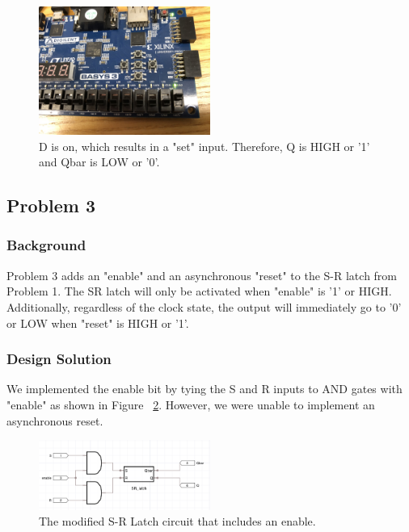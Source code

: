 \documentclass[11pt]{article}
\begin{document}
\begin{figure}[H]
\begin{center}
	\includegraphics[width=0.5\textwidth]{./images/img_202.jpg}
	\caption{\label{fig:dResultTwo}D is on, which results in a "set" input. Therefore, Q is HIGH or '1' and Qbar is LOW or '0'.}
\end{center}
\end{figure}

\subsection{Problem 3}

\subsubsection{Background}
Problem 3 adds an "enable" and an asynchronous "reset" to the S-R latch from Problem 1. The SR latch will only be activated when "enable" is '1' or HIGH. Additionally, regardless of the clock state, the output will immediately go to '0' or LOW when "reset" is HIGH or '1'.

\subsubsection{Design Solution}
We implemented the enable bit by tying the S and R inputs to AND gates with "enable" as shown in Figure ~\ref{fig:modifiedSR_circuit_diagram}. However, we were unable to implement an asynchronous reset.

\begin{figure}[H]
\begin{center}
	\includegraphics[width=0.5\textwidth]{./images/sr_diagram2.png}
	\caption{\label{fig:modifiedSR_circuit_diagram}The modified S-R Latch circuit that includes an enable.}
\end{center}
\end{figure}
\end{document}
